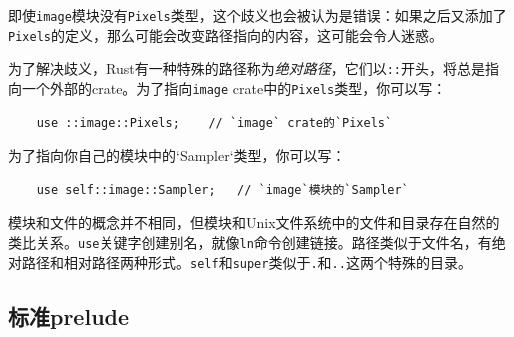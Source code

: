 即使\texttt{image}模块没有\texttt{Pixels}类型，这个歧义也会被认为是错误：如果之后又添加了\texttt{Pixels}的定义，那么可能会改变路径指向的内容，这可能会令人迷惑。

为了解决歧义，Rust有一种特殊的路径称为\emph{绝对路径}，它们以\texttt{::}开头，将总是指向一个外部的crate。为了指向\texttt{image} crate中的\texttt{Pixels}类型，你可以写：
\begin{verbatim}
    use ::image::Pixels;    // `image` crate的`Pixels`
\end{verbatim}

为了指向你自己的模块中的`Sampler`类型，你可以写：
\begin{verbatim}
    use self::image::Sampler;   // `image`模块的`Sampler`
\end{verbatim}

模块和文件的概念并不相同，但模块和Unix文件系统中的文件和目录存在自然的类比关系。\texttt{use}关键字创建别名，就像\texttt{ln}命令创建链接。路径类似于文件名，有绝对路径和相对路径两种形式。\texttt{self}和\texttt{super}类似于\texttt{.}和\texttt{..}这两个特殊的目录。

\subsection{标准prelude}



























